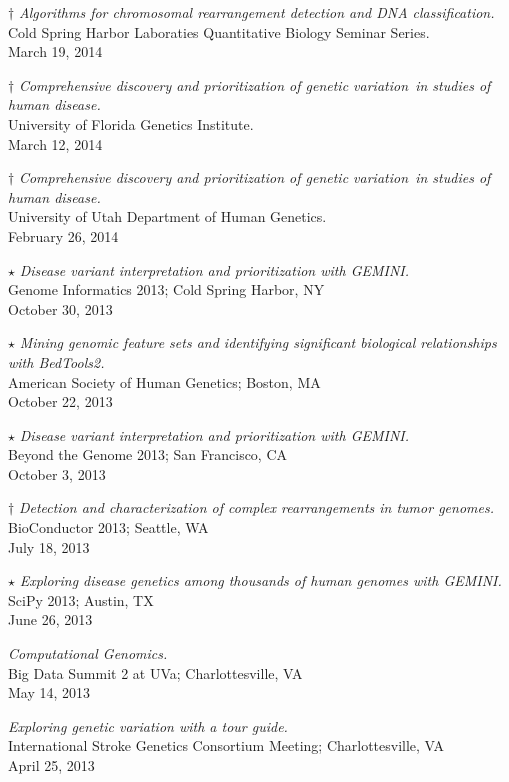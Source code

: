 \documentclass[margin,line]{cv}
\begin{document}
\begin{resume}
    $\dagger$ \textit{Algorithms for chromosomal rearrangement detection and DNA classification.} \\
    Cold Spring Harbor Laboraties Quantitative Biology Seminar Series. \\
    March 19, 2014

    $\dagger$ \textit{Comprehensive discovery and prioritization of genetic variation in studies of human disease.} \\
    University of Florida Genetics Institute. \\
    March 12, 2014

    $\dagger$ \textit{Comprehensive discovery and prioritization of genetic variation in studies of human disease.} \\
    University of Utah Department of Human Genetics. \\
    February 26, 2014

    $\star$ \textit{Disease variant interpretation and prioritization with GEMINI.} \\
    Genome Informatics 2013; Cold Spring Harbor, NY \\
    October 30, 2013

    $\star$ \textit{Mining genomic feature sets and identifying significant biological relationships with BedTools2.} \\
    American Society of Human Genetics; Boston, MA \\
    October 22, 2013

    $\star$ \textit{Disease variant interpretation and prioritization with GEMINI.} \\
    Beyond the Genome 2013; San Francisco, CA \\
    October 3, 2013

    $\dagger$ \textit{Detection and characterization of complex rearrangements in
	tumor genomes.} \\
    BioConductor 2013; Seattle, WA \\
    July 18, 2013

    $\star$ \textit{Exploring disease genetics among thousands of human genomes
	with GEMINI.} \\
    SciPy 2013; Austin, TX \\
    June 26, 2013

    \textit{Computational Genomics.} \\
    Big Data Summit 2 at UVa; Charlottesville, VA \\
    May 14, 2013

    \textit{Exploring genetic variation with a tour guide.} \\
    International Stroke Genetics Consortium Meeting; Charlottesville, VA \\
    April 25, 2013


\end{resume}
\end{document}
